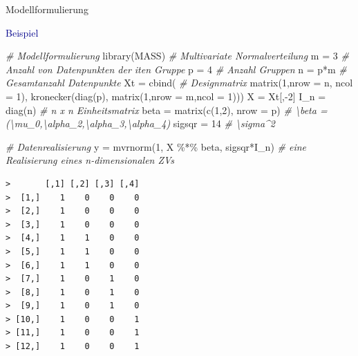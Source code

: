 \documentclass[
  8pt,
  ignorenonframetext,
]{beamer}
\newenvironment{Shaded}{\begin{snugshade}}{\end{snugshade}}
\newcommand{\AttributeTok}[1]{\textcolor[rgb]{0.77,0.63,0.00}{#1}}
\newcommand{\CommentTok}[1]{\textcolor[rgb]{0.56,0.35,0.01}{\textit{#1}}}
\newcommand{\DecValTok}[1]{\textcolor[rgb]{0.00,0.00,0.81}{#1}}
\newcommand{\FunctionTok}[1]{\textcolor[rgb]{0.00,0.00,0.00}{#1}}
\newcommand{\NormalTok}[1]{#1}
\newcommand{\OtherTok}[1]{\textcolor[rgb]{0.56,0.35,0.01}{#1}}
\newcommand{\SpecialCharTok}[1]{\textcolor[rgb]{0.00,0.00,0.00}{#1}}
\begin{document}
\begin{frame}[fragile]{Modellformulierung}
\protect\hypertarget{modellformulierung-6}{}
\vspace{2mm}

\textcolor{darkblue}{Beispiel} \vspace{1mm} \tiny {}

\begin{Shaded}
\begin{Highlighting}[]
\CommentTok{\# Modellformulierung}
\FunctionTok{library}\NormalTok{(MASS)                                             }\CommentTok{\# Multivariate Normalverteilung}
\NormalTok{m      }\OtherTok{=} \DecValTok{3}                                                \CommentTok{\# Anzahl von Datenpunkten der iten Gruppe}
\NormalTok{p      }\OtherTok{=} \DecValTok{4}                                                \CommentTok{\# Anzahl Gruppen}
\NormalTok{n      }\OtherTok{=}\NormalTok{ p}\SpecialCharTok{*}\NormalTok{m                                              }\CommentTok{\# Gesamtanzahl Datenpunkte}
\NormalTok{Xt     }\OtherTok{=} \FunctionTok{cbind}\NormalTok{(                                           }\CommentTok{\# Designmatrix}
         \FunctionTok{matrix}\NormalTok{(}\DecValTok{1}\NormalTok{,}\AttributeTok{nrow =}\NormalTok{ n, }\AttributeTok{ncol =} \DecValTok{1}\NormalTok{),}
         \FunctionTok{kronecker}\NormalTok{(}\FunctionTok{diag}\NormalTok{(p), }\FunctionTok{matrix}\NormalTok{(}\DecValTok{1}\NormalTok{,}\AttributeTok{nrow =}\NormalTok{ m,}\AttributeTok{ncol =} \DecValTok{1}\NormalTok{)))}
\NormalTok{X      }\OtherTok{=}\NormalTok{ Xt[,}\SpecialCharTok{{-}}\DecValTok{2}\NormalTok{]}
\NormalTok{I\_n    }\OtherTok{=} \FunctionTok{diag}\NormalTok{(n)                                          }\CommentTok{\# n x n Einheitsmatrix}
\NormalTok{beta   }\OtherTok{=} \FunctionTok{matrix}\NormalTok{(}\FunctionTok{c}\NormalTok{(}\DecValTok{1}\NormalTok{,}\DecValTok{2}\NormalTok{), }\AttributeTok{nrow =}\NormalTok{ p)                         }\CommentTok{\# \textbackslash{}beta = (\textbackslash{}mu\_0,\textbackslash{}alpha\_2,\textbackslash{}alpha\_3,\textbackslash{}alpha\_4)}
\NormalTok{sigsqr }\OtherTok{=} \DecValTok{14}                                               \CommentTok{\# \textbackslash{}sigma\^{}2}

\CommentTok{\# Datenrealisierung}
\NormalTok{y      }\OtherTok{=} \FunctionTok{mvrnorm}\NormalTok{(}\DecValTok{1}\NormalTok{, X }\SpecialCharTok{\%*\%}\NormalTok{ beta, sigsqr}\SpecialCharTok{*}\NormalTok{I\_n)               }\CommentTok{\# eine Realisierung eines n{-}dimensionalen ZVs}
\end{Highlighting}
\end{Shaded}

\begin{verbatim}
>       [,1] [,2] [,3] [,4]
>  [1,]    1    0    0    0
>  [2,]    1    0    0    0
>  [3,]    1    0    0    0
>  [4,]    1    1    0    0
>  [5,]    1    1    0    0
>  [6,]    1    1    0    0
>  [7,]    1    0    1    0
>  [8,]    1    0    1    0
>  [9,]    1    0    1    0
> [10,]    1    0    0    1
> [11,]    1    0    0    1
> [12,]    1    0    0    1
\end{verbatim}
\end{frame}
\end{document}
